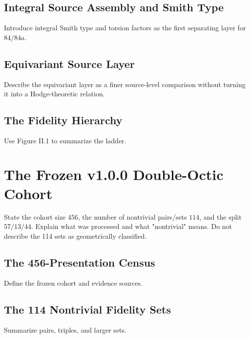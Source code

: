 \subsection{Integral Source Assembly and Smith Type}

Introduce integral Smith type and torsion factors as the first separating
layer for \(84/84a\).

\subsection{Equivariant Source Layer}

Describe the equivariant layer as a finer source-level comparison without
turning it into a Hodge-theoretic relation.

\subsection{The Fidelity Hierarchy}

Use Figure II.1 to summarize the ladder.

\section{The Frozen v1.0.0 Double-Octic Cohort}\label{sec:cohort}


State the cohort size \(456\), the number of nontrivial pairs/sets \(114\), and
the split \(57/13/44\).  Explain what was processed and what "nontrivial"
means.  Do not describe the 114 sets as geometrically classified.

\subsection{The 456-Presentation Census}

Define the frozen cohort and evidence sources.

\subsection{The 114 Nontrivial Fidelity Sets}

Summarize pairs, triples, and larger sets.


